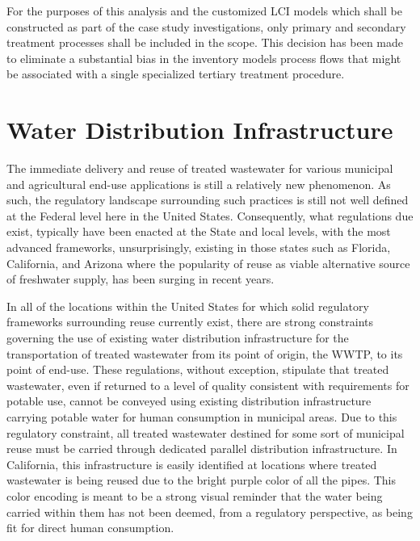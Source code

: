 For the purposes of this analysis and the customized LCI models which shall be constructed as part of the case study investigations, only primary and secondary treatment processes shall be included in the scope. This decision has been made to eliminate a substantial bias in the inventory models process flows that might be associated with a single specialized tertiary treatment procedure.  

\section{Water Distribution Infrastructure}

The immediate delivery and reuse of treated wastewater for various municipal and agricultural end-use applications is still a relatively new phenomenon. As such, the regulatory landscape surrounding such practices is still not well defined at the Federal level here in the United States. Consequently, what regulations due exist, typically have been enacted at the State and local levels, with the most advanced frameworks, unsurprisingly, existing in those states such as Florida, California, and Arizona where the popularity of reuse as viable alternative source of freshwater supply, has been surging in recent years.

In all of the locations within the United States for which solid regulatory frameworks surrounding reuse currently exist, there are strong constraints governing the use of existing water distribution infrastructure for the transportation of treated wastewater from its point of origin, the WWTP, to its point of end-use. These regulations, without exception, stipulate that treated wastewater, even if returned to a level of quality consistent with requirements for potable use, cannot be conveyed using existing distribution infrastructure carrying potable water for human consumption in municipal areas. Due to this regulatory constraint, all treated wastewater destined for some sort of municipal reuse must be carried through dedicated parallel distribution infrastructure. In California, this infrastructure is easily identified at locations where treated wastewater is being reused due to the bright purple color of all the pipes. This color encoding is meant to be a strong visual reminder that the water being carried within them has not been deemed, from a regulatory perspective, as being fit for direct human consumption. 

